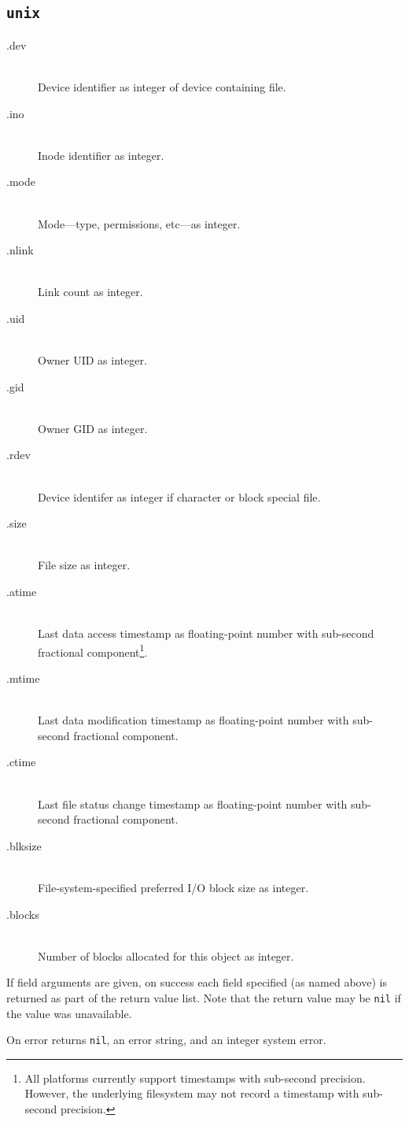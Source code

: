 \documentclass[11pt, oneside]{memoir}
\newcommand*{\nil}[0]{\texttt{nil}\xspace}
\newcounter{toccols}
\newenvironment{Module}[1]{
	\subsection{\texttt{#1}}
	\addtocontents{toc}{
		\protect\begin{multicols}{\value{toccols}}
	}
}{
	\addtocontents{toc}{\protect\end{multicols}}
}
\begin{document}
\begin{Module}{unix}
\begin{description}
\item[.dev] \hfill \\
Device identifier as integer of device containing file.
\item[.ino] \hfill \\
Inode identifier as integer.
\item[.mode] \hfill \\
Mode---type, permissions, etc---as integer.
\item[.nlink] \hfill \\
Link count as integer.
\item[.uid] \hfill \\
Owner UID as integer.
\item[.gid] \hfill \\
Owner GID as integer.
\item[.rdev] \hfill \\
Device identifer as integer if character or block special file.
\item[.size] \hfill \\
File size as integer.
\item[.atime] \hfill \\
Last data access timestamp as floating-point number with sub-second fractional component\footnote{All platforms currently support timestamps with sub-second precision. However, the underlying filesystem may not record a timestamp with sub-second precision.}.
\item[.mtime] \hfill \\
Last data modification timestamp as floating-point number with sub-second fractional component.
\item[.ctime] \hfill \\
Last file status change timestamp as floating-point number with sub-second fractional component.
\item[.blksize] \hfill \\
File-system-specified preferred I/O block size as integer.
\item[.blocks] \hfill \\
Number of blocks allocated for this object as integer.
\end{description}

If field arguments are given, on success each field specified (as named above) is returned as part of the return value list. Note that the return value may be \nil if the value was unavailable.

On error returns \nil, an error string, and an integer system error.


\end{Module}
\end{document}
